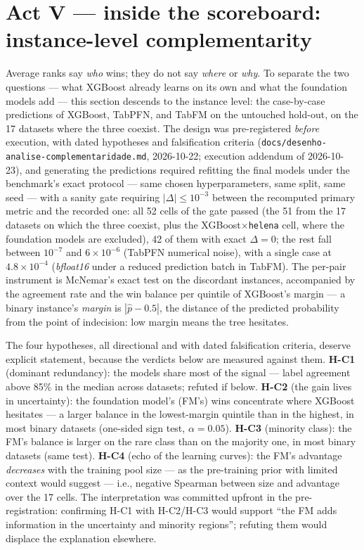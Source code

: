 \section{Act V --- inside the scoreboard: instance-level complementarity}
\label{sec:cap5-ato5}

Average ranks say \emph{who} wins; they do not say \emph{where} or
\emph{why}. To separate the two questions --- what XGBoost already
learns on its own and what the foundation models add --- this section
descends to the instance level: the case-by-case predictions of
XGBoost, TabPFN, and TabFM on the untouched hold-out, on the 17
datasets where the three coexist. The design was pre-registered
\emph{before} execution, with dated hypotheses and falsification
criteria
(\texttt{docs/\allowbreak desenho-\allowbreak analise-\allowbreak complementaridade.\allowbreak md},
2026-10-22; execution addendum of 2026-10-23), and generating
the predictions required refitting the final models under the benchmark's exact
protocol --- same chosen hyperparameters, same split, same seed ---
with a sanity gate requiring $|\Delta| \le 10^{-3}$ between the
recomputed primary metric and the recorded one: all 52 cells of the
gate passed (the 51 from the 17 datasets on which the three coexist,
plus the XGBoost$\times$\texttt{helena} cell, where the foundation
models are excluded), 42 of them with exact $\Delta = 0$; the rest fall between $10^{-7}$
and $6 \times 10^{-6}$ (TabPFN numerical noise), with a single case
at $4.8 \times 10^{-4}$ (\emph{bfloat16} under a reduced prediction
batch in TabFM). The per-pair instrument is McNemar's exact test
\citep{mcnemar1947} on the discordant instances, accompanied by the
agreement rate and the win balance per quintile of XGBoost's margin
--- a binary instance's \emph{margin} is $|\hat p - 0.5|$, the
distance of the predicted probability from the point of indecision:
low margin means the tree hesitates.

The four hypotheses, all directional and with dated falsification
criteria, deserve explicit statement, because the verdicts below are
measured against them. \textbf{H-C1} (dominant redundancy): the
models share most of the signal --- label agreement above 85\% in
the median across datasets; refuted if below. \textbf{H-C2} (the
gain lives in uncertainty): the foundation model's (FM's) wins
concentrate where XGBoost hesitates --- a larger balance in the lowest-margin quintile than in
the highest, in most binary datasets (one-sided sign test,
$\alpha=0.05$). \textbf{H-C3} (minority class): the FM's balance is
larger on the rare class than on the majority one, in most binary
datasets (same test). \textbf{H-C4} (echo of the learning curves):
the FM's advantage \emph{decreases} with the training pool size ---
as the pre-training prior with limited context would suggest ---
i.e., negative Spearman between size and advantage over the 17
cells. The interpretation was committed upfront in the
pre-registration: confirming H-C1 with H-C2/H-C3 would support ``the
FM adds information in the uncertainty and minority regions'';
refuting them would displace the explanation elsewhere.


